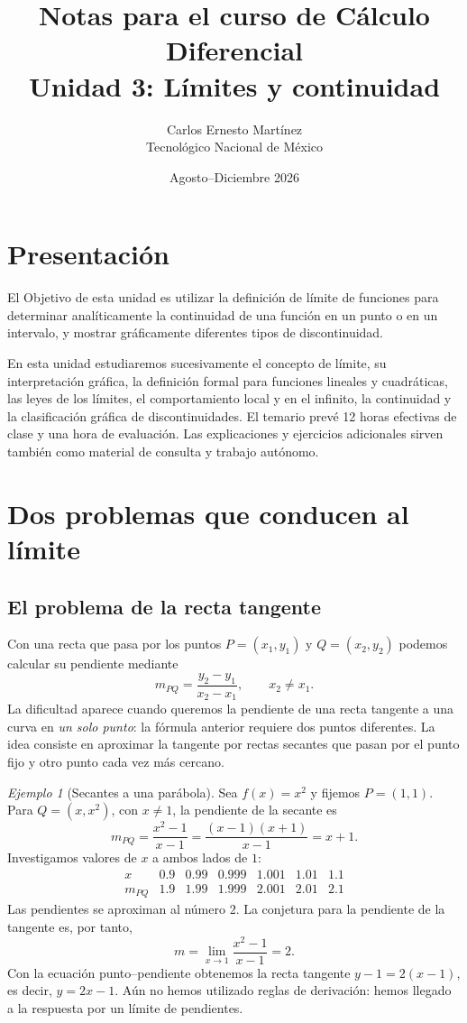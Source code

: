 \documentclass[12pt]{article}
\title{\textbf{Notas para el curso de Cálculo Diferencial}\\[0.35cm]
\Large Unidad 3: Límites y continuidad}
\author{Carlos Ernesto Martínez\\Tecnológico Nacional de México}
\date{Agosto--Diciembre 2026}
\theoremstyle{remark}
\newtheorem{ejemplo}{Ejemplo}
\begin{document}
\maketitle
\tableofcontents
\newpage
\section*{Presentación}
El Objetivo de esta unidad es utilizar la definición de límite de funciones para determinar analíticamente la continuidad de una función en un punto o en un intervalo, y mostrar gráficamente diferentes tipos de discontinuidad.

En esta unidad estudiaremos sucesivamente el concepto de límite, su interpretación gráfica, la definición formal para funciones lineales y cuadráticas, las leyes de los límites, el comportamiento local y en el infinito, la continuidad y la clasificación gráfica de discontinuidades. El temario prevé 12 horas efectivas de clase y una hora de evaluación. Las explicaciones y ejercicios adicionales sirven también como material de consulta y trabajo autónomo.

\section*{Dos problemas que conducen al límite}
\subsection*{El problema de la recta tangente}
Con una recta que pasa por los puntos $P=(x_1,y_1)$ y $Q=(x_2,y_2)$ podemos calcular su pendiente mediante
\[
 m_{PQ}=\frac{y_2-y_1}{x_2-x_1},\qquad x_2\ne x_1.
\]
La dificultad aparece cuando queremos la pendiente de una recta tangente a una curva en \emph{un solo punto}: la fórmula anterior requiere dos puntos diferentes. La idea consiste en aproximar la tangente por rectas secantes que pasan por el punto fijo y otro punto cada vez más cercano.

\begin{ejemplo}[Secantes a una parábola]
Sea $f(x)=x^2$ y fijemos $P=(1,1)$. Para $Q=(x,x^2)$, con $x\ne1$, la pendiente de la secante es
\[
 m_{PQ}=\frac{x^2-1}{x-1}=\frac{(x-1)(x+1)}{x-1}=x+1.
\]
Investigamos valores de $x$ a ambos lados de $1$:
\[
\begin{array}{c|rrrrrr}
 x&0.9&0.99&0.999&1.001&1.01&1.1\\\hline
 m_{PQ}&1.9&1.99&1.999&2.001&2.01&2.1
\end{array}
\]
Las pendientes se aproximan al número $2$. La conjetura para la pendiente de la tangente es, por tanto,
\[
 m=\lim_{x\to1}\frac{x^2-1}{x-1}=2.
\]
Con la ecuación punto--pendiente obtenemos la recta tangente $y-1=2(x-1)$, es decir, $\boxed{y=2x-1}$. Aún no hemos utilizado reglas de derivación: hemos llegado a la respuesta por un límite de pendientes.
\end{ejemplo}
\end{document}
